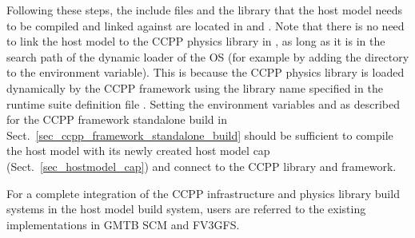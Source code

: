 Following these steps, the include files and the library  that the host model needs to be compiled and linked against are located in  and . Note that there is no need to link the host model to the CCPP physics library in , as long as it is in the search path of the dynamic loader of the OS (for example by adding the directory  to the  environment variable). This is because the CCPP physics library is loaded dynamically by the CCPP framework using the library name specified in the runtime suite definition file . Setting the environment variables  and  as described for the CCPP framework standalone build in Sect.~\ref{sec_ccpp_framework_standalone_build} should be sufficient to compile the host model with its newly created host model cap (Sect.~\ref{sec_hostmodel_cap}) and connect to the CCPP library and framework.

For a complete integration of the CCPP infrastructure and physics library build systems in the host model build system, users are referred to the existing implementations in GMTB SCM and FV3GFS.
